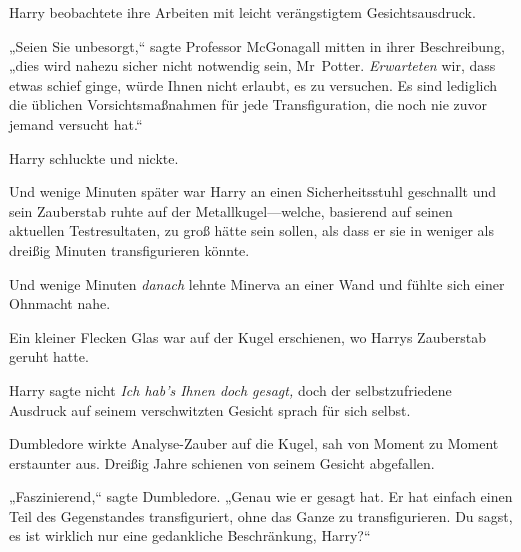 Harry beobachtete ihre Arbeiten mit leicht verängstigtem Gesichtsausdruck.

„Seien Sie unbesorgt,“ sagte Professor McGonagall mitten in ihrer Beschreibung, „dies wird nahezu sicher nicht notwendig sein, Mr~Potter. \emph{Erwarteten} wir, dass etwas schief ginge, würde Ihnen nicht erlaubt, es zu versuchen. Es sind lediglich die üblichen Vorsichtsmaßnahmen für jede Transfiguration, die noch nie zuvor jemand versucht hat.“

Harry schluckte und nickte.

Und wenige Minuten später war Harry an einen Sicherheitsstuhl geschnallt und sein Zauberstab ruhte auf der Metallkugel—welche, basierend auf seinen aktuellen Testresultaten, zu groß hätte sein sollen, als dass er sie in weniger als dreißig Minuten transfigurieren könnte.

Und wenige Minuten \emph{danach} lehnte Minerva an einer Wand und fühlte sich einer Ohnmacht nahe.

Ein kleiner Flecken Glas war auf der Kugel erschienen, wo Harrys Zauberstab geruht hatte.

Harry sagte nicht \emph{Ich hab’s Ihnen doch gesagt,} doch der selbstzufriedene Ausdruck auf seinem verschwitzten Gesicht sprach für sich selbst.

Dumbledore wirkte Analyse-Zauber auf die Kugel, sah von Moment zu Moment erstaunter aus. Dreißig Jahre schienen von seinem Gesicht abgefallen.

„Faszinierend,“ sagte Dumbledore. „Genau wie er gesagt hat. Er hat einfach einen Teil des Gegenstandes transfiguriert, ohne das Ganze zu transfigurieren. Du sagst, es ist wirklich nur eine gedankliche Beschränkung, Harry?“

